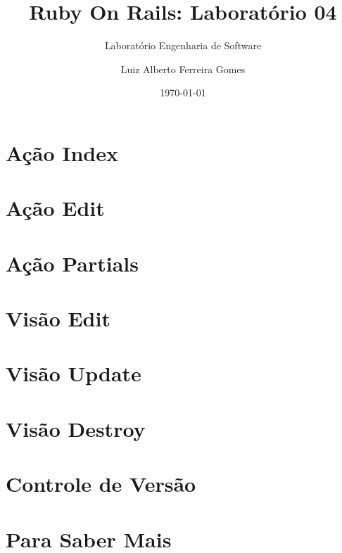 \documentclass[t, 				             
			   final,
			   12pt, 				         
			   xcolor={usenames,dvipsnames}, 
			   table]{beamer}
\begin{document}
    \author{Luiz Alberto Ferreira Gomes}
    \title{Ruby On Rails: Laboratório 04}
    \subtitle{Laboratório Engenharia de Software}
    \date{\today}

	
	  	

    \section{Ação Index}
	
    \section{Ação Edit}
	
    \section{Ação Partials}
	
    \section{Visão Edit}
	
    \section{Visão Update}
	
    \section{Visão Destroy}
	
    \section{Controle de Versão}
	
    
    \section{Para Saber Mais}
	
\end{document}
